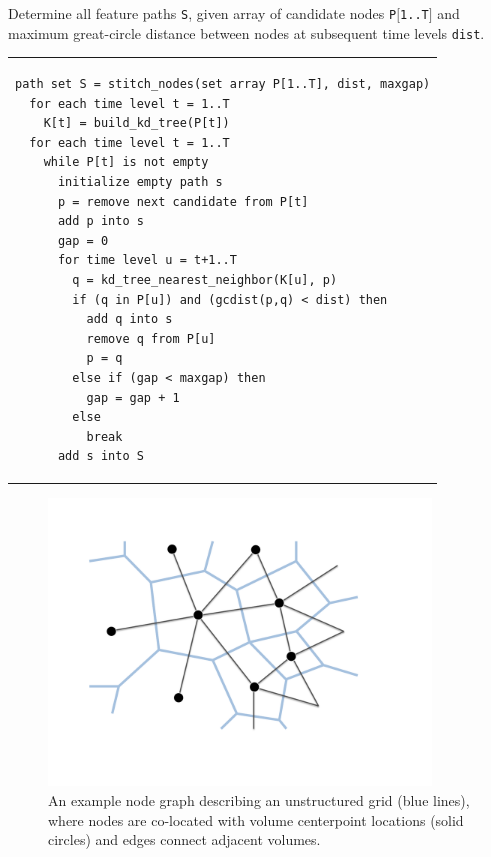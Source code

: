 \documentclass[gmdd, hvmath]{copernicus}
\begin{document}
\begin{algorithm}
\caption{Determine all feature paths \texttt{S}, given array of candidate nodes \texttt{P$[$1..T$]$} and maximum great-circle distance between nodes at subsequent time levels \texttt{dist}.\ \\} \label{alg:stitch_nodes}
\noindent \begin{tabular}{p{5in}}
\small \begin{verbatim}
path set S = stitch_nodes(set array P[1..T], dist, maxgap)
  for each time level t = 1..T
    K[t] = build_kd_tree(P[t])
  for each time level t = 1..T
    while P[t] is not empty
      initialize empty path s
      p = remove next candidate from P[t]
      add p into s
      gap = 0
      for time level u = t+1..T
        q = kd_tree_nearest_neighbor(K[u], p)
        if (q in P[u]) and (gcdist(p,q) < dist) then
          add q into s
          remove q from P[u]
          p = q
        else if (gap < maxgap) then
          gap = gap + 1
        else
          break
      add s into S
\end{verbatim} \\
\end{tabular}
\end{algorithm}


\begin{figure}
\begin{center}
\includegraphics[width=4in]{UnstructuredGrid.pdf}
\end{center}
\caption{An example node graph describing an unstructured grid (blue lines), where nodes are co-located with volume centerpoint locations (solid circles) and edges connect adjacent volumes.} \label{fig:unstructured_grid}
\end{figure}
\end{document}
